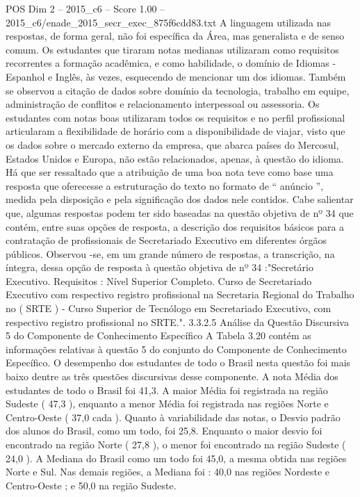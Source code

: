 \begin{textsample}{POS Dim 2 – 2015\_c6 – Score 1.00 – 2015\_c6/enade\_2015\_secr\_exec\_875f6cdd83.txt}
A linguagem utilizada nas respostas, de forma geral, não foi específica da Área, mas generalista e de senso comum.
Os estudantes que tiraram notas medianas utilizaram como requisitos recorrentes a formação acadêmica, e como habilidade, o domínio de Idiomas - Espanhol e Inglês, às vezes, esquecendo de mencionar um dos idiomas.
Também se observou a citação de dados sobre domínio da tecnologia, trabalho em equipe, administração de conflitos e relacionamento interpessoal ou assessoria.
Os estudantes com notas boas utilizaram todos os requisitos e no perfil profissional articularam a flexibilidade de horário com a disponibilidade de viajar, visto que os dados sobre o mercado externo da empresa, que abarca países do Mercosul, Estados Unidos e Europa, não estão relacionados, apenas, à questão do idioma.
Há que ser ressaltado que a atribuição de uma boa nota teve como base uma resposta que oferecesse a estruturação do texto no formato de “ anúncio ”, medida pela disposição e pela significação dos dados nele contidos.
Cabe salientar que, algumas respostas podem ter sido baseadas na questão objetiva de nº 34 que contém, entre suas opções de resposta, a descrição dos requisitos básicos para a contratação de profissionais de Secretariado Executivo em diferentes órgãos públicos.
Observou -se, em um grande número de respostas, a transcrição, na íntegra, dessa opção de resposta à questão objetiva de nº 34 :"Secretário Executivo.
Requisitos : Nível Superior Completo.
Curso de Secretariado Executivo com respectivo registro profissional na Secretaria Regional do Trabalho no ( SRTE ) - Curso Superior de Tecnólogo em Secretariado Executivo, com respectivo registro profissional no SRTE.". 3.3.2.5 Análise da Questão Discursiva 5 do Componente de Conhecimento Específico A Tabela 3.20 contém as informações relativas à questão 5 do conjunto do Componente de Conhecimento Específico.
O desempenho dos estudantes de todo o Brasil nesta questão foi mais baixo dentre as três questões discursivas desse componente.
A nota Média dos estudantes de todo o Brasil foi 41,3.
A maior Média foi registrada na região Sudeste ( 47,3 ), enquanto a menor Média foi registrada nas regiões Norte e Centro-Oeste ( 37,0 cada ).
Quanto à variabilidade das notas, o Desvio padrão dos alunos do Brasil, como um todo, foi 25,8.
Enquanto o maior desvio foi encontrado na região Norte ( 27,8 ), o menor foi encontrado na região Sudeste ( 24,0 ).
A Mediana do Brasil como um todo foi 45,0, a mesma obtida nas regiões Norte e Sul.
Nas demais regiões, a Mediana foi : 40,0 nas regiões Nordeste e Centro-Oeste ; e 50,0 na região Sudeste.

\end{textsample}
